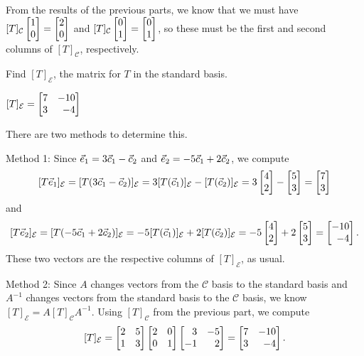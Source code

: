 \begin{parts}[resume]
\begin{solution}
				From the results of the previous parts, we know that we must have
				$[T]_{\mathcal C}\mat{1\\0}=\mat{2\\0}$ and
				$[T]_{\mathcal C}\mat{0\\1}=\mat{0\\1}$, so these
				must be the first and second columns of $[T]_{\mathcal C}$, respectively.
			\end{solution}
		\item Find $[T]_{\mathcal E}$, the matrix for $T$ in the standard basis.
			\begin{solution}
				$[T]_{\mathcal E}=\mat{7&-10\\3&-4}$

				There are two methods to determine this.

				Method 1:
				Since ${\vec e_1}=3\vec c_1-\vec c_2$ and ${\vec e_2}=-5\vec c_1+2\vec c_2$,
				we compute
				\[
					[T\xhat]_{\mathcal E}
					=[T(3\vec c_1-\vec c_2)]_{\mathcal E}
					=3[T(\vec c_1)]_{\mathcal E}-[T(\vec c_2)]_{\mathcal E}
					=3\mat{4\\2}-\mat{5\\3}
					=\mat{7\\3}
				\]
				and
				\[
					[T\yhat]_{\mathcal E}
					=[T(-5\vec c_1+2\vec c_2)]_{\mathcal E}
					=-5[T(\vec c_1)]_{\mathcal E}+2[T(\vec c_2)]_{\mathcal E}
					=-5\mat{4\\2}+2\mat{5\\3}
					=\mat{-10\\-4}.
				\]
				These two vectors are the respective columns of $[T]_{\mathcal E}$,
				as usual.

				Method 2:
				Since $A$ changes vectors from the $\mathcal C$ basis to the standard
				basis and $A^{-1}$ changes vectors from the standard basis to the
				$\mathcal C$ basis, we know $[T]_{\mathcal E} = A[T]_{\mathcal C}A^{-1}$.
				Using $[T]_{\mathcal C}$ from the previous part, we compute
				\[
					[T]_{\mathcal E}
					=\mat{2&5\\1&3}\mat{2&0\\0&1}\mat{3&-5\\-1&2}
					=\mat{7&-10\\3&-4}.
				\]


			\end{solution}
	\end{parts}




